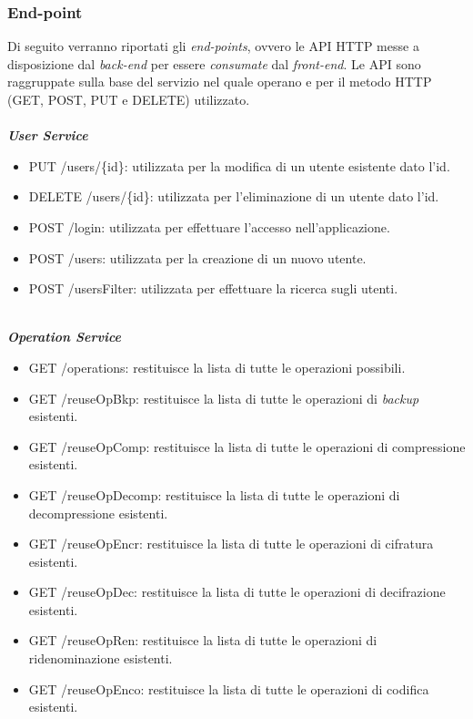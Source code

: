 \subsubsection{End-point}
Di seguito verranno riportati gli \textit{end-points}, ovvero le \gls{API} \gls{HTTP} messe a disposizione dal \textit{back-end} per essere \textit{consumate} dal \textit{front-end}. Le \gls{API} sono raggruppate sulla base del servizio nel quale operano e per il metodo \gls{HTTP} (GET, POST, PUT e DELETE) utilizzato.\\
\ \\
\textbf{\textit{User Service}}
\begin{itemize}
    \item PUT /users/\{id\}: utilizzata per la modifica di un utente esistente dato l'id.
    \item DELETE /users/\{id\}: utilizzata per l'eliminazione di un utente dato l'id.
    \item POST /login: utilizzata per effettuare l'accesso nell'applicazione.
    \item POST /users: utilizzata per la creazione di un nuovo utente.
    \item POST /usersFilter: utilizzata per effettuare la ricerca sugli utenti.
\end{itemize}
\ \\
\textbf{\textit{Operation Service}}
\begin{itemize}
    \item GET /operations: restituisce la lista di tutte le operazioni possibili.
    \item GET /reuseOpBkp: restituisce la lista di tutte le operazioni di \textit{backup} esistenti.
    \item GET /reuseOpComp: restituisce la lista di tutte le operazioni di compressione esistenti.
    \item GET /reuseOpDecomp: restituisce la lista di tutte le operazioni di decompressione esistenti.
    \item GET /reuseOpEncr: restituisce la lista di tutte le operazioni di cifratura esistenti.
     \item GET /reuseOpDec: restituisce la lista di tutte le operazioni di decifrazione esistenti.
    \item GET /reuseOpRen: restituisce la lista di tutte le operazioni di ridenominazione esistenti.
     \item GET /reuseOpEnco: restituisce la lista di tutte le operazioni di codifica  esistenti.
\end{itemize}

